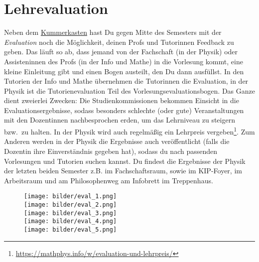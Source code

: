 \section{Lehrevaluation}
\label{eval}



\noindent Neben dem \hyperref[kummerkasten]{Kummerkasten} hast Du gegen Mitte des Semesters mit der \emph{Evaluation} noch die Möglichkeit, deinen Profs und Tutorinnen Feedback zu geben. Das läuft so ab, dass jemand von der Fachschaft (in der Physik) oder Assisteninnen des Profs (in der Info und Mathe) in die Vorlesung kommt, eine kleine Einleitung gibt und einen Bogen austeilt, den Du dann ausfüllst. In den Tutorien der Info und Mathe übernehmen die Tutorinnen die Evaluation, in der Physik ist die Tutorienevaluation Teil des Vorlesungsevaluationsbogen.
Das Ganze dient zweierlei Zwecken: Die Studienkommissionen bekommen Einsicht in die Evaluationsergebnisse, sodass besonders schlechte (oder gute) Veranstaltungen mit den Dozentinnen nachbesprochen erden, um das Lehrniveau zu steigern bzw.\ zu halten. In der Physik wird auch regelmäßig ein Lehrpreis vergeben\footnote{\url{https://mathphys.info/w/evaluation-und-lehrpreis/}}. Zum Anderen werden in der Physik die Ergebnisse auch veröffentlicht (falls die Dozentin ihre Einverständnis gegeben hat), sodass du nach passenden Vorlesungen und Tutorien suchen kannst. Du findest die Ergebnisse der Physik der letzten beiden Semester z.B. im Fachschaftsraum, sowie im \gls{KIP}-Foyer, im Arbeitsraum und am Philosophenweg am Infobrett im Treppenhaus.

\vspace{1cm}


\begin{figure}[h]
    \begin{center}
        \texttt{[image: bilder/eval\_1.png]}\\
        \texttt{[image: bilder/eval\_2.png]}\\
        \texttt{[image: bilder/eval\_3.png]}\\
        \texttt{[image: bilder/eval\_4.png]}\\
        \texttt{[image: bilder/eval\_5.png]}\\
    \end{center}
\end{figure}

\vfill

